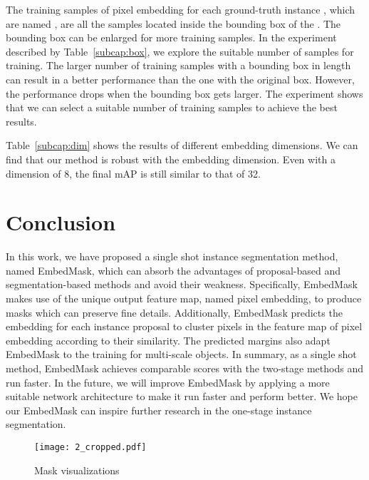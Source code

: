 \documentclass[10pt,twocolumn,letterpaper]{article}
\begin{document}
\medbreak
{}
The training samples of pixel embedding for each ground-truth instance , which are named , are all the samples located inside the bounding box of the . 
The bounding box can be enlarged for more training samples. 
In the experiment described by Table~\ref{subcap:box}, we explore the suitable number of samples for training. 
The larger number of training samples with a  bounding box in length can result in a better performance than the one with the original box. 
However, the performance drops when the bounding box gets larger. 
The experiment shows that we can select a suitable number of training samples to achieve the best results.

\medbreak
{}
Table~\ref{subcap:dim} shows the results of different embedding dimensions. 
We can find that our method is robust with the embedding dimension. Even with a dimension of 8, the final mAP is still similar to that of 32. 


\section{Conclusion}

In this work, we have proposed a single shot instance segmentation method, named EmbedMask, which can absorb the advantages of proposal-based and segmentation-based methods and avoid their weakness.
Specifically, EmbedMask makes use of the unique output feature map, named pixel embedding, to produce masks which can preserve fine details. 
Additionally, EmbedMask predicts the embedding for each instance proposal to cluster pixels in the feature map of pixel embedding according to their similarity. 
The predicted margins also adapt EmbedMask to the training for multi-scale objects.
In summary, as a single shot method, EmbedMask achieves comparable scores with the two-stage methods and run faster. 
In the future, we will improve EmbedMask by applying a more suitable network architecture to make it run faster and perform better. 
We hope our EmbedMask can inspire further research in the one-stage instance segmentation.





{\small


}

\begin{figure*}
   \begin{center}
      \texttt{[image: 2\_cropped.pdf]}
   \end{center}\vspace{-0.1in}
      \caption{Mask visualizations}
   \label{fig:maskvis}
\end{figure*}
\end{document}
